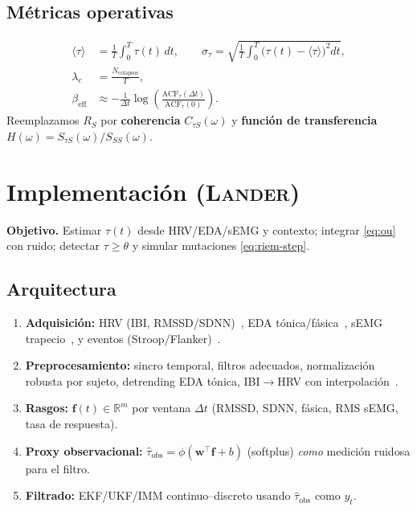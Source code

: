 \documentclass[10pt,a4paper,twocolumn]{article}
\theoremstyle{definition}
\theoremstyle{plain}
\begin{document}
\subsection{Métricas operativas}
\begin{align}
\langle\tau\rangle &= \frac{1}{T}\int_0^T \tau(t)\,dt, \qquad
\sigma_{\tau} = \sqrt{\frac{1}{T}\int_0^T \big(\tau(t)-\langle\tau\rangle\big)^2 dt}, \label{eq:mean_tau}\\
\lambda_c &= \frac{N_{\mathrm{colapsos}}}{T}, \label{eq:lambda_c}\\
\beta_{\mathrm{eff}} &\approx -\frac{1}{\Delta t}\log\!\left(\frac{\mathrm{ACF}_{\tau}(\Delta t)}{\mathrm{ACF}_{\tau}(0)}\right). \label{eq:beta_eff}
\end{align}
Reemplazamos \(R_S\) por \textbf{coherencia} \(C_{\tau S}(\omega)\) y \textbf{función de transferencia} \(H(\omega)=S_{\tau S}(\omega)/S_{SS}(\omega)\).

\section{Implementación (\textsc{Lander})}
\textbf{Objetivo.} Estimar \(\tau(t)\) desde HRV/EDA/sEMG y contexto; integrar \eqref{eq:ou} con ruido; detectar \(\tau\ge\theta\) y simular mutaciones \eqref{eq:riem-step}.

\subsection{Arquitectura}
\begin{enumerate}[label=\alph*)]
  \item \textbf{Adquisición:} HRV (IBI, RMSSD/SDNN)~\cite{shaffer2017}, EDA tónica/fásica~\cite{boucsein2012}, sEMG trapecio~\cite{lundberg1994,luijcks2014,campanini2020,cheng2023}, y eventos (Stroop/Flanker)~\cite{scarpina2017,eriksen1974}.
  \item \textbf{Preprocesamiento:} sincro temporal, filtros adecuados, normalización robusta por sujeto, detrending EDA tónica, IBI\(\to\)HRV con interpolación~\cite{shaffer2017}.
  \item \textbf{Rasgos:} \(\mathbf{f}(t)\in\mathbb{R}^m\) por ventana \(\Delta t\) (RMSSD, SDNN, fásica, RMS sEMG, tasa de respuesta).
  \item \textbf{Proxy observacional:} \(\widehat{\tau}_{\mathrm{obs}}=\phi(\mathbf{w}^\top\mathbf{f}+b)\) (softplus) \emph{como} medición ruidosa para el filtro.
  \item \textbf{Filtrado:} EKF/UKF/IMM continuo–discreto usando \(\widehat{\tau}_{\mathrm{obs}}\) como \(y_t\).
\end{enumerate}
\end{document}
